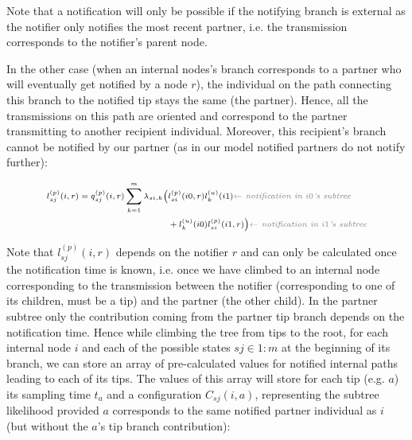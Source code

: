 \documentclass[a4paper,10pt]{article}
\begin{document}
Note that a notification will only be possible if the notifying branch is external as the notifier only notifies the most recent partner, i.e. the transmission corresponds to the notifier's parent node. %

In the other case (when an internal nodes's branch corresponds to a partner who will eventually get notified by a node $r$), the individual on the path connecting this branch to the notified tip stays the same (the partner). Hence, all the transmissions on this path are oriented and correspond to the partner transmitting to another recipient individual. Moreover, this recipient's branch cannot be notified by our partner (as in our model notified partners do not notify further):

 
\begin{equation}
\scriptsize
\begin{split}
l^{(p)}_{sj}(i, r) = q^{(p)}_{sj}(i,r) \sum\limits_{k=1}^{m}  \lambda_{si,k}\Big(&l^{(p)}_{si}(i0,r)l^{(u)}_{k}(i1) \textit{\color{gray} $\leftarrow$ notification in $i0$'s subtree} \\
 &+ l^{(u)}_{k}(i0)l^{(p)}_{si}(i1,r)\Big)  \textit{\color{gray} $\leftarrow$ notification in $i1$'s subtree} 
\end{split}\label{eq:lu}
\end{equation}

Note that $l^{(p)}_{sj}(i, r)$ depends on the notifier $r$ and can only be calculated once the notification time is known, i.e. once we have climbed to an internal node corresponding to the transmission between the notifier (corresponding to one of its children, must be a tip) and the partner (the other child). In the partner subtree only the contribution coming from the partner tip branch depends on the notification time. Hence while climbing the tree from tips to the root, for each internal node $i$ and each of the possible states $sj \in 1:m$ at the beginning of its branch, we can store an array of pre-calculated values for notified internal paths leading to each of its tips. The values of this array will store for each tip (e.g. $a$) its sampling time $t_a$ and a configuration $C_{sj}(i,a)$, representing the subtree likelihood provided $a$ corresponds to the same notified partner individual as $i$ (but without the $a$'s tip branch contribution): 
\end{document}
